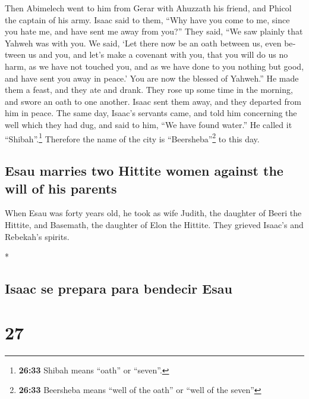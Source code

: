 \begin{paracol}{2}
\begin{otherlanguage}{english}
 Then Abimelech went to him from Gerar with Ahuzzath his
friend, and Phicol the captain of his army.  Isaac said
to them, ``Why have you come to me, since you hate me, and have sent me
away from you?''  They said, ``We saw plainly that Yahweh
was with you. We said, `Let there now be an oath between us, even
between us and you, and let's make a covenant with you, 
that you will do us no harm, as we have not touched you, and as we have
done to you nothing but good, and have sent you away in peace.' You are
now the blessed of Yahweh.''  He made them a feast, and
they ate and drank.  They rose up some time in the
morning, and swore an oath to one another. Isaac sent them away, and
they departed from him in peace.  The same day, Isaac's
servants came, and told him concerning the well which they had dug, and
said to him, ``We have found water.''  He called it
``Shibah''.\footnote{\textbf{26:33} Shibah means ``oath'' or ``seven''.}
Therefore the name of the city is ``Beersheba''\footnote{\textbf{26:33}
  Beersheba means ``well of the oath'' or ``well of the seven''} to this
day.

\hypertarget{esau-marries-two-hittite-women-against-the-will-of-his-parents}{%
\subsection{Esau marries two Hittite women against the will of his
parents}\label{esau-marries-two-hittite-women-against-the-will-of-his-parents}}

 When Esau was forty years old, he took as wife Judith,
the daughter of Beeri the Hittite, and Basemath, the daughter of Elon
the Hittite.  They grieved Isaac's and Rebekah's spirits.

\end{otherlanguage}

\switchcolumn[0]*

\hypertarget{isaac-se-prepara-para-bendecir-esau}{%
\subsection{Isaac se prepara para bendecir
Esau}\label{isaac-se-prepara-para-bendecir-esau}}

\hypertarget{section-52}{%
\section{27}\label{section-52}}


\end{paracol}
